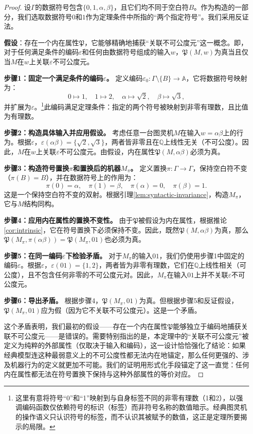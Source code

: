 \documentclass{ctexart}
\newtheorem{proof}[theorem]{证明}
\begin{document}
	\begin{proof}
		设$\Gamma$的数据符号包含$\{0, 1, \alpha, \beta\}$，且它们均不同于空白符$B$。作为构造的一部分，我们选取数据符号$0$和$1$作为定理条件中所指的``两个指定符号''。我们采用反证法。
		
		\textbf{假设}：存在一个内在属性$\mathfrak{P}$，它能够精确地捕获``关联不可公度元''这一概念。即，对于任何满足条件的编码$\varepsilon$和任何由数据符号组成的输入$w$，$\mathfrak{P}(M, w)$为真当且仅当$M$在$w$上关联$\varepsilon$不可公度元。
		
		\textbf{步骤1：固定一个满足条件的编码$\varepsilon$。}
		定义编码$\varepsilon_0: \Gamma \setminus \{B\} \to \mathbb{A}$，它将数据符号映射为：
		\[
		0 \mapsto 1,\quad 1 \mapsto 2,\quad \alpha \mapsto \sqrt{2},\quad \beta \mapsto \sqrt{3},
		\]
		并扩展为$\varepsilon$。\footnote{这里有意将符号``0''和``1''映射到与自身标签不同的非零有理数（1和2），以强调编码函数仅依赖符号的标识（标签）而非符号名称的数值暗示。经典图灵机的操作语义只认识符号的标签，而不认识其被赋予的数值，这正是定理所要揭示的局限。}此编码满足定理条件：指定的两个符号被映射到非零有理数，且比值为有理数。
		
		\textbf{步骤2：构造具体输入并应用假设。}
		考虑任意一台图灵机$M$在输入$w = \alpha\beta$上的行为。根据$\varepsilon$，$\varepsilon(\alpha\beta) = \{\sqrt{2}, \sqrt{3}\}$，两者皆非零且在$\mathbb{Q}$上线性无关（不可公度）。因此，$M$在$w$上关联$\varepsilon$不可公度元。由假设，内在属性$\mathfrak{P}(M, \alpha\beta)$必须为真。
		
		\textbf{步骤3：构造符号置换$\pi$和置换后的机器$M_\pi$。}
		定义置换$\pi: \Gamma \to \Gamma$，保持空白符不变（$\pi(B)=B$），并在数据符号上的作用为：
		\[
		\pi(0) = \alpha,\quad \pi(1) = \beta,\quad \pi(\alpha) = 0,\quad \pi(\beta) = 1.
		\]
		这是一个保持空白符不变的双射。根据引理\ref{lem:syntactic-invariance}，构造$M_\pi$，它与$M$结构同构。
		
		\textbf{步骤4：应用内在属性的置换不变性。}
		由于$\mathfrak{P}$被假设为内在属性，根据推论\ref{cor:intrinsic}，它在符号置换下必须保持不变。因此，既然$\mathfrak{P}(M, \alpha\beta)$为真，那么$\mathfrak{P}(M_\pi, \pi(\alpha\beta)) = \mathfrak{P}(M_\pi, 01)$也必须为真。
		
		\textbf{步骤5：在同一编码$\varepsilon$下检验矛盾。}
		对于$M_\pi$的输入$01$，我们仍使用步骤1中固定的编码$\varepsilon$。根据$\varepsilon$，$\varepsilon(0 1) = \{1, 2\}$，两者皆为非零有理数，它们在$\mathbb{Q}$上线性相关（可公度），且不包含任何非零的不可公度元对。因此，$M_\pi$在输入$01$上并不关联$\varepsilon$不可公度元。
		
		\textbf{步骤6：导出矛盾。}
		根据步骤4，$\mathfrak{P}(M_\pi, 01)$为真。但根据步骤5和反证假设，$\mathfrak{P}(M_\pi, 01)$应为假（因为它不关联不可公度元）。这是一个矛盾。
		
		这个矛盾表明，我们最初的假设——存在一个内在属性$\mathfrak{P}$能够独立于编码地捕获关联不可公度元——是错误的。需要特别指出的是，本定理中的``关联不可公度元''被定义为纯粹的外部属性（仅取决于输入和编码），这一设计恰恰强化了结论：如果经典模型连这种最弱意义上的不可公度性都无法内在地锚定，那么任何更强的、涉及机器行为的定义就更加不可能。我们的证明用形式化手段锚定了这一直觉：任何内在属性都无法在符号置换下保持与这种外部属性的等价对应。
	\end{proof}
	
\end{document}
